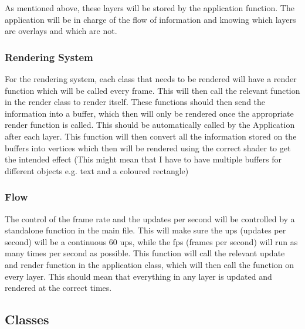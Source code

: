 \documentclass{article}
\begin{document}
                As mentioned above, these layers will be stored by the application function. The application will be in charge of the flow of information and knowing which layers are overlays and which are not.
            \subsubsection{Rendering System}
                For the rendering system, each class that needs to be rendered will have a render function which will be called every frame. This will then call the relevant function in the render class to render itself. These functions should then send the information into a buffer, which then will only be rendered once the appropriate render function is called. This should be automatically called by the Application after each layer. This function will then convert all the information stored on the buffers into vertices which then will be rendered using the correct shader to get the intended effect (This might mean that I have to have multiple buffers for different objects e.g. text and a coloured rectangle)
            \subsubsection{Flow}
                The control of the frame rate and the updates per second will be controlled by a standalone function in the main file. This will make sure the ups (updates per second) will be a continuous 60 ups, while the fps (frames per second) will run as many times per second as possible. This function will call the relevant update and render function in the application class, which will then call the function on every layer. This should mean that everything in any layer is updated and rendered at the correct times.
        \clearpage
        \subsection{Classes}
\end{document}
